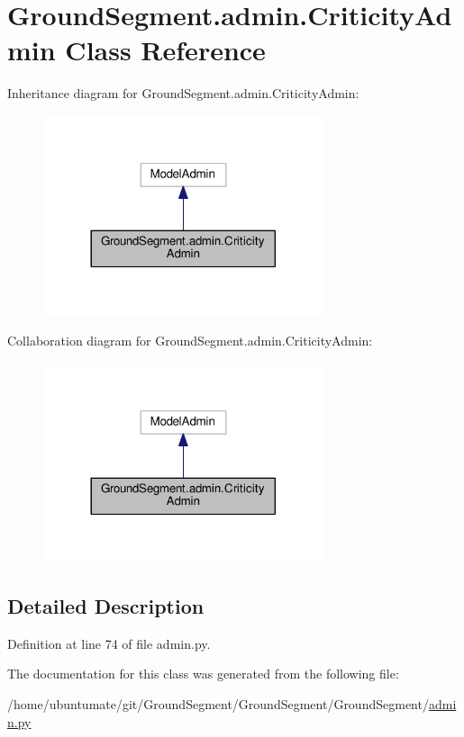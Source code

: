 \hypertarget{class_ground_segment_1_1admin_1_1_criticity_admin}{}\section{Ground\+Segment.\+admin.\+Criticity\+Admin Class Reference}
\label{class_ground_segment_1_1admin_1_1_criticity_admin}


Inheritance diagram for Ground\+Segment.\+admin.\+Criticity\+Admin\+:\nopagebreak
\begin{figure}[H]
\begin{center}
\leavevmode
\includegraphics[width=233pt]{class_ground_segment_1_1admin_1_1_criticity_admin__inherit__graph}
\end{center}
\end{figure}


Collaboration diagram for Ground\+Segment.\+admin.\+Criticity\+Admin\+:\nopagebreak
\begin{figure}[H]
\begin{center}
\leavevmode
\includegraphics[width=233pt]{class_ground_segment_1_1admin_1_1_criticity_admin__coll__graph}
\end{center}
\end{figure}


\subsection{Detailed Description}


Definition at line 74 of file admin.\+py.



The documentation for this class was generated from the following file\+:\begin{DoxyCompactItemize}
\item 
/home/ubuntumate/git/\+Ground\+Segment/\+Ground\+Segment/\+Ground\+Segment/\hyperlink{admin_8py}{admin.\+py}\end{DoxyCompactItemize}

